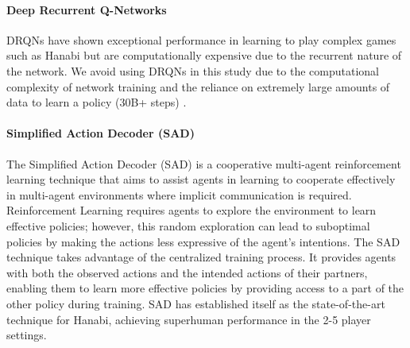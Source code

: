 \paragraph*{Deep Recurrent Q-Networks}
DRQNs have shown exceptional performance in learning to play complex games such as Hanabi but are computationally expensive due to the recurrent nature of the network. We avoid using DRQNs in this study due to the computational complexity of network training and the reliance on extremely large amounts of data to learn a policy (30B+ steps) \cite{bardHanabiChallengeNew2020a,huSimplifiedActionDecoder2021,foersterBayesianActionDecoder2019}.
\paragraph*{Simplified Action Decoder (SAD)}
The Simplified Action Decoder (SAD) \cite{huSimplifiedActionDecoder2021} is a cooperative multi-agent reinforcement learning technique that aims to assist agents in learning to cooperate effectively in multi-agent environments where implicit communication is required. Reinforcement Learning requires agents to explore the environment to learn effective policies; however, this random exploration can lead to suboptimal policies by making the actions less expressive of the agent's intentions. The SAD technique takes advantage of the centralized training process. It provides agents with both the observed actions and the intended actions of their partners, enabling them to learn more effective policies by providing access to a part of the other policy during training. SAD has established itself as the state-of-the-art technique for Hanabi, achieving superhuman performance in the 2-5 player settings.
